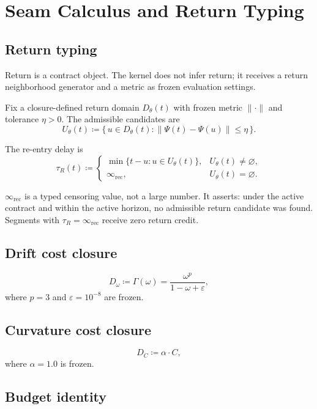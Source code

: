 \documentclass[
  aps,
  prd,
  twocolumn,
  superscriptaddress,
  nofootinbib,
  floatfix
]{revtex4-2}
\newcommand{\tR}{\tau_{\!R}}
\newcommand{\Gam}{\Gamma}
\newcommand{\eps}{\varepsilon}
\newcommand{\IR}{\infty_{\mathrm{rec}}}
\newcommand{\beq}{\begin{equation}}
\newcommand{\eeq}{\end{equation}}
\begin{document}
\section{Seam Calculus and Return Typing}\label{sec:seam}

\subsection{Return typing}\label{sec:return}

Return is a contract object.  The kernel does not infer return; it
receives a return neighborhood generator and a metric as frozen
evaluation settings.

Fix a closure-defined return domain $D_\theta(t)$ with frozen
metric $\|\cdot\|$ and tolerance $\eta > 0$.  The admissible
candidates are
\beq
  U_\theta(t) \coloneqq \bigl\{\,u \in D_\theta(t) :
  \|\Psi(t) - \Psi(u)\| \leq \eta\,\bigr\}.
\eeq

The re-entry delay is
\beq
  \tR(t) \coloneqq
  \begin{cases}
    \min\{t - u : u \in U_\theta(t)\}, &
      U_\theta(t) \neq \varnothing, \\
    \IR, & U_\theta(t) = \varnothing.
  \end{cases}
\eeq

$\IR$ is a typed censoring value, not a large number.  It asserts:
under the active contract and within the active horizon, no
admissible return candidate was found.  Segments with $\tR = \IR$
receive zero return credit.

\subsection{Drift cost closure}

\beq
  D_\omega \coloneqq \Gam(\omega)
  = \frac{\omega^p}{1 - \omega + \eps},
\eeq
where $p = 3$ and $\eps = 10^{-8}$ are frozen.

\subsection{Curvature cost closure}

\beq
  D_C \coloneqq \alpha \cdot C,
\eeq
where $\alpha = 1.0$ is frozen.

\subsection{Budget identity}
\end{document}
